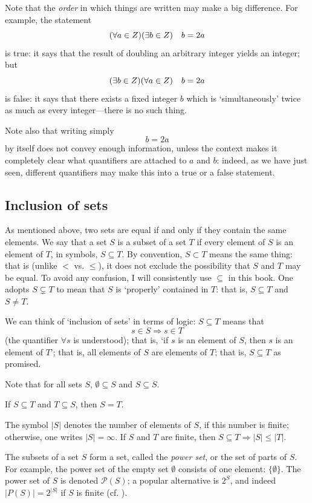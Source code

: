 Note that the \emph{order} in which things are written may make a big
difference. For example, the statement
\[(\forall a \in Z) (\exists b \in Z)\quad b = 2a\] is true: it says
that the result of doubling an arbitrary integer yields an integer;
but
\[(\exists b \in Z) (\forall a \in Z)\quad b = 2a\] is false: it
says that there exists a fixed integer $b$ which is `simultaneously'
twice as much as every integer---there is no such thing.

Note also that writing simply
\[b = 2a\] by itself does not convey enough information, unless the
context makes it completely clear what quantifiers are attached to $a$
and $b$: indeed, as we have just seen, different quantifiers may make
this into a true or a false statement.

\subsection{Inclusion of sets}%
\label{subsec:prelims:inclusion-of-sets}
As mentioned above, two sets are equal if and only if they contain the
same elements. We say that a set $S$ is a subset of a set $T$ if every
element of $S$ is an element of $T$, in symbols, $S \subseteq T$.  By
convention, $S \subset T$ means the same thing: that is (unlike $<$
vs. $\leq$), it does not exclude the possibility that $S$ and $T$ may
be equal. To avoid any confusion, I will consistently use $\subseteq$
in this book. One adopts $S \subsetneq T$ to mean that $S$ is
`properly' contained in $T$: that is, $S \subseteq T$ and $S \ne T$.

We can think of `inclusion of sets' in terms of logic: $S \subseteq T$
means that \[s \in S \Rightarrow s \in T\] (the quantifier $\forall s$
is understood); that is, `if $s$ is an element of $S$, then $s$ is an
element of $T$'; that is, all elements of $S$ are elements of $T$;
that is, $S \subseteq T$ as promised.

Note that for all sets $S$, $\emptyset \subseteq S$ and
$S \subseteq S$.

If $S \subseteq T$ and $T \subseteq S$, then $S = T$.

The symbol $|S|$ denotes the number of elements of $S$, if this number
is finite; otherwise, one writes $|S| = \infty$. If $S$ and $T$ are
finite, then $S \subseteq T \Rightarrow |S| \leq |T |$.

The subsets of a set $S$ form a set, called the \emph{power
  set}, or the set of parts of $S$. For example, the
power set of the empty set $\emptyset$ consists of one element:
$\{\emptyset\}$. The power set of $S$ is denoted $\mathcal{P}(S)$; a
popular alternative is $2^S$, and indeed $|P(S)| = 2^{|S|}$ if $S$ is
finite (cf. ).


